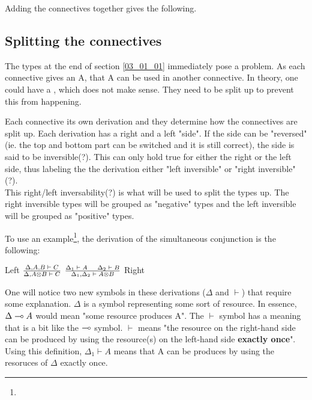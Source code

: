 Adding the connectives together gives the following.

\subsection{Splitting the connectives}
\label{03_01_02}

The types at the end of section \ref{03_01_01} immediately pose a problem. As each connective gives an A, that A can be used in another connective. In theory, one could have a , which does not make sense. They need to be split up to prevent this from happening.

Each connective its own derivation and they determine how the connectives are split up. Each derivation has a right and a left "side". If the side can be "reversed" (ie. the top and bottom part can be switched and it is still correct), the side is said to be inversible(?). This can only hold true for either the right or the left side, thus labeling the the derivation either "left inversible" or "right inversible"(?).\\ 
This right/left inversability(?) is what will be used to split the types up. The right inversible types will be grouped as "negative" types and the left inversible will be grouped as "positive" types.

To use an example\footnote{}, the derivation of the simultaneous conjunction is the following:
\begin{texto}
	Left $\frac{\Delta , A, B \;\vdash\; C}{\Delta , A \otimes B \;\vdash\; C}$ \hspace{50pt}
	$\frac{\Delta_1 \;\vdash\; A \hspace{12pt} \Delta_2 \;\vdash\; B}{\Delta_1 , \Delta_2 \;\vdash\; A \otimes B}$ Right
\end{texto}
One will notice two new symbols in these derivations ($\Delta$ and $\vdash$) that require some explanation. $\Delta$ is a symbol representing some sort of resource. In essence, $\Delta \multimap A$ would mean "some resource produces A". The $\vdash$ symbol has a meaning that is a bit like the $\multimap$ symbol. $\vdash$ means "the resource on the right-hand side can be produced by using the resource(s) on the left-hand side \textbf{exactly once}". Using this definition, $\Delta_1 \vdash A$ means that A can be produces by using the resoruces of $\Delta$ exactly once.

